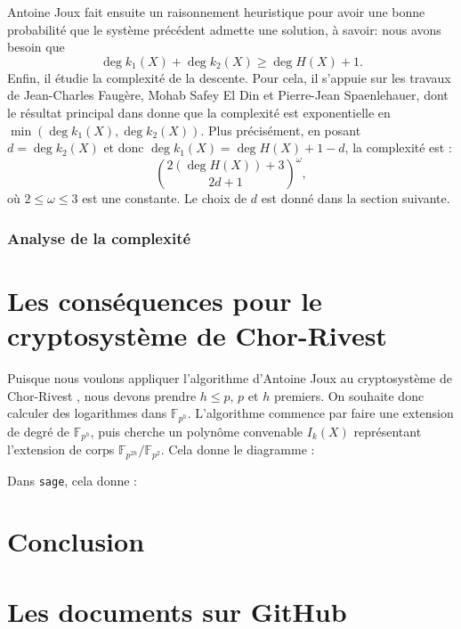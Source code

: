 \documentclass[a4paper, titlepage, 11pt]{article}
\theoremstyle{definition}
\theoremstyle{remark}
\def\gf #1{\mathbb{F}_{#1}}
\newcommand{\extension}[2]{{#1} / {#2}} %
\begin{document}
Antoine Joux \cite{joux2013} fait ensuite un raisonnement heuristique pour avoir une bonne probabilité que le système précédent admette une solution, à savoir: nous avons besoin que 
$$\deg k_1(X) + \deg k_2(X) \geqslant \deg H(X) + 1.$$
Enfin, il étudie la complexité de la descente. Pour cela, il s'appuie sur les travaux de Jean-Charles Faugère, Mohab Safey El Din et Pierre-Jean Spaenlehauer, dont le résultat principal dans \cite{faugere2011, spaenlehauer2012} donne que la complexité est exponentielle en $\min(\deg k_1(X), \deg k_2 (X))$.
Plus précisément, en posant $d = \deg k_2(X)$ et donc $\deg k_1(X) = \deg H(X) +1 - d$, la complexité est :
$$\binom{2 (\deg H(X)) + 3}{2d+1}^\omega,$$
où $2 \leqslant \omega \leqslant 3$ est une constante. 
Le choix de $d$ est donné dans la section suivante.

\subsubsection{Analyse de la complexité}

\section{Les conséquences pour le cryptosystème de Chor-Rivest}\label{sec:consequences}

Puisque nous voulons appliquer l'algorithme d'Antoine Joux \cite{joux2013} au cryptosystème de Chor-Rivest \cite{chorRivest1988}, nous devons prendre $h \leqslant p$, $p$ et $h$ premiers. On souhaite donc calculer des logarithmes dans $\gf{p^h}$. L'algorithme commence par faire une extension de degré de $\gf{p^h}$, puis cherche un polynôme convenable $I_k(X)$ représentant l'extension de corps $\extension{\gf{p^{2h}}}{\gf{p^2}}$. Cela donne le diagramme :
\begin{figure}[h]
\begin{center}
\end{center}
\end{figure}
 
Dans \verb|sage|, cela donne :

\section*{Conclusion}

\newpage
\thispagestyle{empty}



\newpage
\appendix

\section{Les documents sur GitHub}
\end{document}
